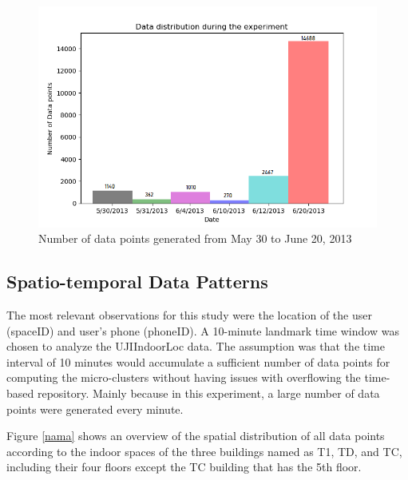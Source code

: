 \begin{figure}[!ht]
    \centering
    \includegraphics[width = 12 cm]{image/Chapters/Chapter6/timedist.png}
    \caption{Number of data points generated from May 30 to June 20, 2013}
    \label{timeline}
\end{figure}

\subsection{Spatio-temporal Data Patterns}

The most relevant observations for this study were the location of the user (spaceID) and user's phone (phoneID). A 10-minute landmark time window was chosen to analyze the UJIIndoorLoc data. The assumption was that the time interval of 10 minutes would accumulate a sufficient number of data points for computing the micro-clusters without having issues with overflowing the time-based repository. Mainly because in this experiment, a large number of data points were generated every minute.

Figure \ref{nama} shows an overview of the spatial distribution of all data points according to the indoor spaces of the three buildings named as T1, TD, and TC, including their four floors except the TC  building that has the 5th floor. 

